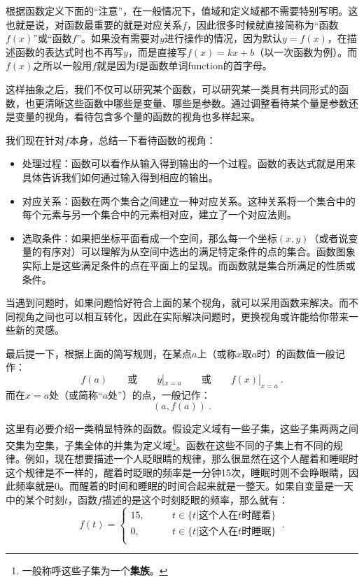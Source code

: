 根据函数定义下面的“注意”，在一般情况下，值域和定义域都不需要特别写明。这也就是说，对函数最重要的就是对应关系$f$，因此很多时候就直接简称为“函数$f(x)$”或“函数$f$”。如果没有需要对$y$进行操作的情况，因为默认$y=f(x)$，在描述函数的表达式时也不再写$y$，而是直接写$f(x)=kx+b$（以一次函数为例）。而$f(x)$之所以一般用$f$就是因为f是函数单词function的首字母。

这样抽象之后，我们不仅可以研究某个函数，可以研究某一类具有共同形式的函数，也更清晰这些函数中哪些是变量、哪些是参数。通过调整看待某个量是参数还是变量的视角，看待包含多个量的函数的视角也多样起来。

我们现在针对$f$本身，总结一下看待函数的视角：

\begin{itemize}
\item 处理过程：函数可以看作从输入得到输出的一个过程。函数的表达式就是用来具体告诉我们如何通过输入得到相应的输出。
\item 对应关系：函数在两个集合之间建立一种对应关系。这种关系将一个集合中的每个元素与另一个集合中的元素相对应，建立了一个对应法则。
\item 选取条件：如果把坐标平面看成一个空间，那么每一个坐标$(x,y)$（或者说变量的有序对）可以理解为从空间中选出的满足特定条件的点的集合。函数图象实际上是这些满足条件的点在平面上的呈现。而函数就是集合所满足的性质或条件。
\end{itemize}

当遇到问题时，如果问题恰好符合上面的某个视角，就可以采用函数来解决。而不同视角之间也可以相互转化，因此在实际解决问题时，更换视角或许能给你带来一些新的灵感。

最后提一下，根据上面的简写规则，在某点$a$上（或称$x$取$a$时）的函数值一般记作：
\begin{equation}
f(a)\qquad\text{或}\qquad y|_{x=a}\qquad\text{或}\qquad f(x)|_{x=a}~.
\end{equation}
而在$x=a$处（或简称“$a$处”）的点，一般记作：
\begin{equation}
(a,f(a))~.
\end{equation}

这里有必要介绍一类稍显特殊的函数。假设定义域有一些子集，这些子集两两之间交集为空集，子集全体的并集为定义域\footnote{一般称呼这些子集为一个\textbf{集族}。}。函数在这些不同的子集上有不同的规律。例如，现在想要描述一个人眨眼睛的规律，那么很显然在这个人醒着和睡眠时这个规律是不一样的，醒着时眨眼的频率是一分钟15次，睡眠时则不会睁眼睛，因此频率就是0。而醒着的时间和睡眠的时间合起来就是一整天。如果自变量是一天中的某个时刻$t$，函数$f$描述的是这个时刻眨眼的频率，那么就有：
\begin{equation}
f(t)=
\begin{cases}
15,\qquad&t\in\{t|\text{这个人在}t\text{时醒着}\}\\
0,\qquad&t\in\{t|\text{这个人在}t\text{时睡眠}\}\\
\end{cases}~.
\end{equation}

